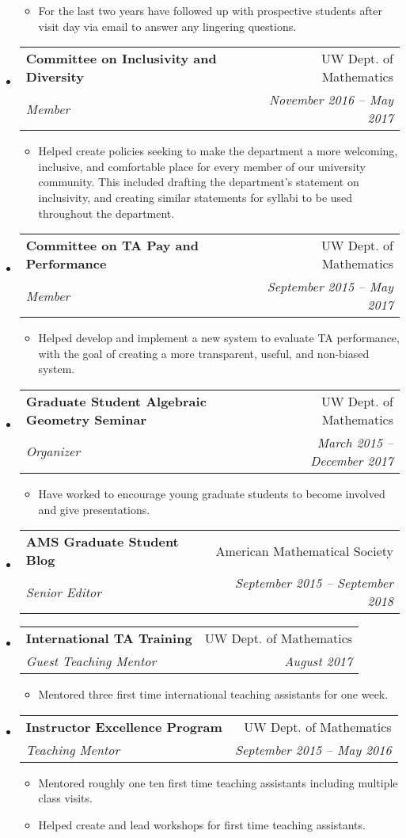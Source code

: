 \documentclass[letterpaper,11pt]{article}
\makeatletter
\newcommand{\ressubheading}[4]{
\begin{tabular*}{6.5in}[t]{l@{\cftdotfill{\cftsecdotsep}\extracolsep{\fill}}r}
		\textbf{#1} & #2 \\
		\textit{#3} & \textit{#4} \\
\end{tabular*}\vspace{-6pt}}
\makeatother
\begin{document}
\begin{itemize}
\begin{itemize}
		\item For the last two years have followed up with prospective students after visit day via email to answer any lingering questions. 
	\end{itemize}
	
\item 
	\ressubheading{Committee on Inclusivity and Diversity}{UW Dept. of Mathematics}{Member}{November 2016 -- May 2017}
	\begin{itemize}
		\item Helped create policies seeking to make the department a more welcoming, inclusive, and comfortable place for every member of our university community. This included drafting the department's statement on inclusivity, and creating similar statements for syllabi to be used throughout the department.
	\end{itemize}
\item 
	\ressubheading{Committee on TA Pay and Performance}{UW Dept. of Mathematics}{Member}{September 2015 -- May 2017}
	\begin{itemize}
	\item Helped develop and implement a new system to evaluate TA performance, with the goal of creating a more transparent, useful, and non-biased system.
	\end{itemize}

\item 
	\ressubheading{Graduate Student Algebraic Geometry Seminar}{UW Dept. of Mathematics}{Organizer}{March 2015 -- December 2017}
	\begin{itemize}
	\item Have worked to encourage young graduate students to become involved and give presentations.
	\end{itemize}
		
\item 
	\ressubheading{AMS Graduate Student Blog}{American Mathematical Society}{Senior Editor}{September 2015 -- September 2018}
	
\item 
	\ressubheading{International TA Training}{UW Dept. of Mathematics}{Guest Teaching Mentor}{August 2017}
	\begin{itemize}
		\item Mentored three first time international teaching assistants for one week.
	\end{itemize}
	
\item 
	\ressubheading{Instructor Excellence Program}{UW Dept. of Mathematics}{Teaching Mentor}{September 2015 -- May 2016}
	\begin{itemize}
		\item Mentored roughly one ten first time teaching assistants including multiple class visits.
		\item Helped create and lead workshops for first time teaching assistants.
	\end{itemize}

\end{itemize}
\end{document}
